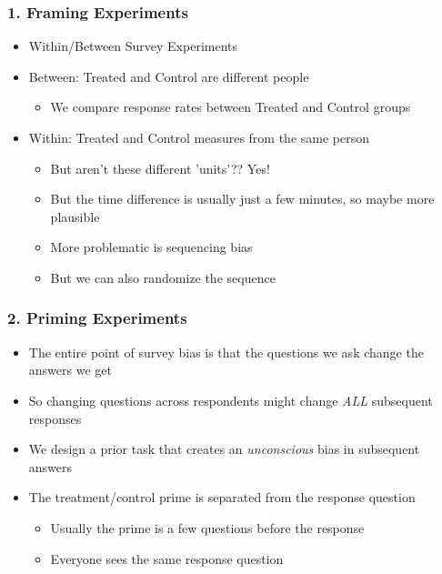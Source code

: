 \documentclass[xcolor=x11names,compress]{beamer}\usepackage[]{graphicx}\usepackage[]{color}
\renewcommand{\(}{\begin{columns}}
\renewcommand{\)}{\end{columns}}
\newcommand{\<}[1]{\begin{column}{#1}}
\renewcommand{\>}{\end{column}}
\begin{document}
\begin{frame}
\frametitle{1. Framing Experiments}
\begin{itemize}
\item Within/Between Survey Experiments
\pause
\item Between: Treated and Control are different people
\begin{itemize}
\pause
\item We compare response rates between Treated and Control groups
\end{itemize}
\pause
\item Within: Treated and Control measures from the same person
\begin{itemize}
\item But aren't these different 'units'?? \pause Yes!
\pause
\item But the time difference is usually just a few minutes, so maybe more plausible
\pause
\item More problematic is sequencing bias
\pause
\item But we can also randomize the sequence
\end{itemize}
\end{itemize}
\end{frame}

\begin{frame}
\frametitle{2. Priming Experiments}
\begin{itemize}
\item The entire point of survey bias is that the questions we ask change the answers we get
\pause
\item So changing questions across respondents might change \textit{ALL} subsequent responses
\pause
\item We design a prior task that creates an \textit{unconscious} bias in subsequent answers
\pause
\item The treatment/control prime is separated from the response question
\pause
\begin{itemize}
\item Usually the prime is a few questions before the response
\pause
\item Everyone sees the same response question
\end{itemize}
\end{itemize}
\end{frame}
\end{document}
